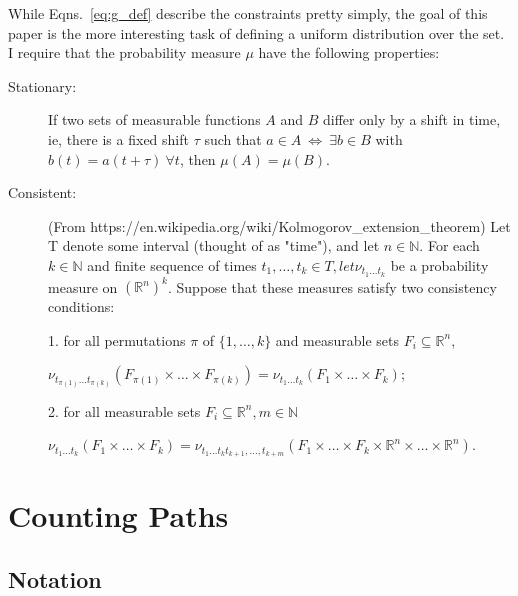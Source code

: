 \documentclass[12pt]{article} \usepackage{amsmath,amsfonts}
\newcommand{\measure}{\mu}
\begin{document}
While Eqns.~\eqref{eq:g_def} describe the constraints pretty simply,
the goal of this paper is the more interesting task of defining a
uniform distribution over the set.  I require that the probability
measure $\measure$ have the following properties:
\begin{description}
\item[Stationary:] If two sets of measurable functions $A$ and $B$
  differ only by a shift in time, ie, there is a fixed shift $\tau$
  such that $a \in A ~ \iff ~ \exists b \in B$ with $b(t) =
  a(t+\tau)~\forall t$, then $\mu(A) = \mu(B)$.
\item[Consistent:] (From
  https://en.wikipedia.org/wiki/Kolmogorov\_extension\_theorem) Let T
  denote some interval (thought of as "time"), and let $n \in
  \mathbb{N}$. For each $k \in \mathbb{N}$ and finite sequence of
  times $t_{1}, \dots, t_{k} \in T, let \nu_{t_{1} \dots t_{k}}$ be a
  probability measure on $(\mathbb{R}^{n})^{k}$. Suppose that these
  measures satisfy two consistency conditions:

  1. for all permutations $\pi$ of $\{ 1, \dots, k \}$ and measurable sets
  $F_{i} \subseteq \mathbb{R}^{n}$,

  $\nu_{t_{\pi (1)} \dots t_{\pi (k)}} \left( F_{\pi (1)} \times \dots
    \times F_{ \pi(k)} \right) = \nu_{t_{1} \dots t_{k}} \left( F_{1}
    \times \dots \times F_{k} \right)$;

  2. for all measurable sets $F_{i} \subseteq \mathbb{R}^{n},m \in
  \mathbb{N}$

  $\nu_{t_{1} \dots t_{k}} \left( F_{1} \times \dots \times F_{k}
  \right) = \nu_{t_{1} \dots t_{k} t_{k + 1}, \dots , t_{k+m}} \left(
    F_{1} \times \dots \times F_{k} \times \mathbb{R}^{n} \times \dots
    \times \mathbb{R}^{n} \right)$.
\end{description}

\section{Counting Paths}
\label{sec:counting}

\subsection{Notation}
\label{sec:notation1}
\end{document}
